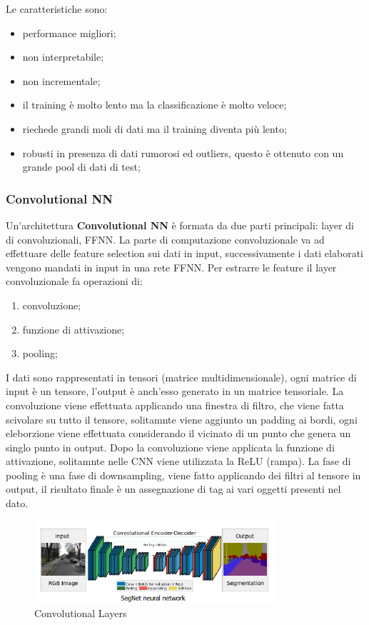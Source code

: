 \documentclass[12pt]{article}
\begin{document}
Le caratteristiche sono:
\begin{itemize}
    \item performance migliori;
    \item non interpretabile;
    \item non incrementale;
    \item il training \`e molto lento ma la classificazione \`e molto veloce;
    \item riechede grandi moli di dati ma il training diventa pi\`u lento;
    \item robusti in presenza di dati rumorosi ed outliers, questo \`e ottenuto con un grande pool di dati di test;
\end{itemize}

\subsubsection{Convolutional NN}
Un'architettura \textbf{Convolutional NN} \`e formata da due parti principali: layer di di convoluzionali, FFNN. La parte di computazione convoluzionale va ad effettuare delle feature selection sui dati in input, successivamente i dati elaborati vengono mandati in input in una rete FFNN. Per estrarre le feature il layer convoluzionale fa operazioni di:
\begin{enumerate}
    \item convoluzione;
    \item funzione di attivazione;
    \item pooling;
\end{enumerate}
I dati sono rappresentati in tensori (matrice multidimensionale), ogni matrice di input \`e un tensore, l'output \`e anch'esso generato in un matrice tensoriale. La convoluzione viene effettuata applicando una finestra di filtro, che viene fatta scivolare su tutto il tensore, solitamnte viene aggiunto un padding ai bordi, ogni eleborzione viene effettuata considerando il vicinato di un punto che genera un singlo punto in output. Dopo la convoluzione viene applicata la funzione di attivazione, solitamnte nelle CNN viene utilizzata la ReLU (rampa). La fase di pooling \`e una fase di downsampling, viene fatto applicando dei filtri al tensore in output, il risultato finale \`e un assegnazione di tag ai vari oggetti presenti nel dato.
\begin{figure}[H]
    \centering
    \includegraphics[width=0.8\textwidth]{convolutional-layers.png}
    \caption{Convolutional Layers}
    \label{fig:convolutional-layers}
\end{figure}
\end{document}
